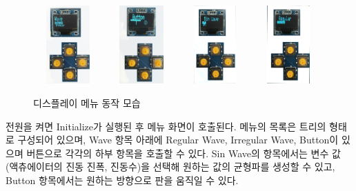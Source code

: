\begin{figure}[H]
            \includegraphics[trim=10 1050 100 0, clip, width=0.24\textwidth, height=3cm]{images/OLED1.png} 
            \includegraphics[trim=100 1550 100 0, clip, width=0.24\textwidth, height=3cm]{images/OLED2.png}
            \includegraphics[trim=30 950 150 0,clip, width=0.24\textwidth, height=3cm]{images/OLED3.png}
            \includegraphics[trim=30 950 100 0, clip, width=0.24\textwidth, height=3cm]{images/OLED4.png}
        \caption{디스플레이 메뉴 동작 모습}
        \label{Oled}   
    \end{figure} 
    
전원을 켜면 Initialize가 실행된 후 메뉴 화면이 호출된다. 메뉴의 목록은 트리의 형태로 구성되어 있으며, Wave 항목 아래에 Regular Wave, Irregular Wave, Button이 있으며 버튼으로 각각의 하부 항목을 호출할 수 있다. Sin Wave의 항목에서는 변수 값 (액츄에이터의 진동 진폭, 진동수)을 선택해 원하는 값의 균형파를 생성할 수 있고, Button 항목에서는 원하는 방향으로 판을 움직일 수 있다.
